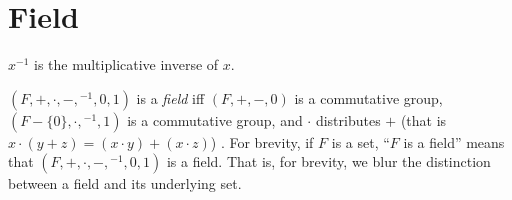 \section{Field}

\(x^{-1}\) is the multiplicative inverse of \(x\).

%
\((F,+,\cdot,-,{}^{-1},0,1)\) is a \emph{field} iff
\((F,+,-,0)\) is a commutative group,
\((F-\{0\},\cdot,{}^{-1},1)\) is a commutative group,
and \(\cdot\) distributes \(+\) (that is \(x \cdot (y + z) = (x \cdot y) + (x \cdot z)\)) \cite{wpfield}.
For brevity, if \(F\) is a set, ``\(F\) is a field'' means that \((F,+,\cdot,-,{}^{-1},0,1)\) is a field.
That is, for brevity, we blur the distinction between a field and its underlying set.
